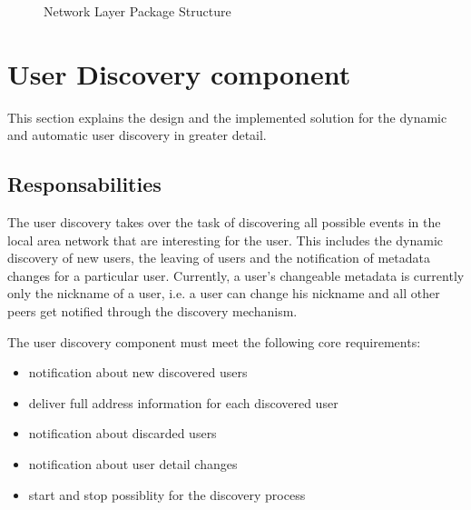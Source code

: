 \begin{figure}[H]
 \centering
 \caption{Network Layer Package Structure}
 \label{fig:network.architecture.package}
\end{figure}


\section{User Discovery component}
This section explains the design and the implemented solution for the dynamic and automatic user discovery in greater detail.

\subsection{Responsabilities}
The user discovery takes over the task of discovering all possible events in the local area network that are interesting for the user. This includes the dynamic discovery of new users, the leaving of users and the notification of metadata changes for a particular user. Currently, a user's changeable metadata is currently only the nickname of a user, i.e. a user can change his nickname and all other peers get notified through the discovery mechanism.

The user discovery component must meet the following core requirements:

\begin{itemize}
 \item notification about new discovered users
 \item deliver full address information for each discovered user
 \item notification about discarded users
 \item notification about user detail changes
 \item start and stop possiblity for the discovery process 
\end{itemize}

